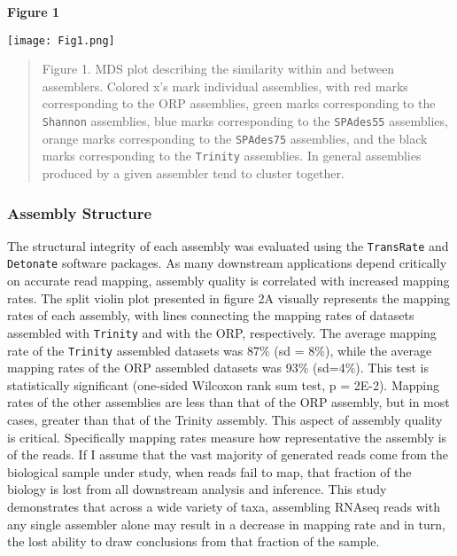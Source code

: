 \documentclass[10pt,letterpaper]{article}
\begin{document}
\newpage
\textbf{\hypertarget{Figure 1}{Figure 1}} \\
\centerline{\texttt{[image: Fig1.png]}}
\begin{quote}
\small{Figure 1. MDS plot describing the similarity within and between assemblers. Colored x's mark individual assemblies, with red marks corresponding to the ORP assemblies, green marks corresponding to the \texttt{Shannon} assemblies, blue marks corresponding to the \texttt{SPAdes55} assemblies, orange marks corresponding to the \texttt{SPAdes75} assemblies, and the black marks corresponding to the \texttt{Trinity} assemblies. In general assemblies produced by a given assembler tend to cluster together.}
\end{quote} 

  

\subsubsection{Assembly Structure}

The structural integrity of each assembly was evaluated using the \texttt{TransRate} and \texttt{Detonate} software packages. As many downstream applications depend critically on accurate read mapping, assembly quality is correlated with increased mapping rates. The split violin plot presented in figure 2A visually represents the mapping rates of each assembly, with lines connecting the mapping rates of datasets assembled with \texttt{Trinity} and with the ORP, respectively. The average mapping rate of the \texttt{Trinity} assembled datasets was 87\% (sd = 8\%), while the average mapping rates of the ORP assembled datasets was 93\% (sd=4\%). This test is statistically significant (one-sided Wilcoxon rank sum test, p = 2E-2). Mapping rates of the other assemblies are less than that of the ORP assembly, but in most cases, greater than that of the Trinity assembly. This aspect of assembly quality is critical. Specifically mapping rates measure how representative the assembly is of the reads. If I assume that the vast majority of generated reads come from the biological sample under study, when reads fail to map, that fraction of the biology is lost from all downstream analysis and inference. This study demonstrates that across a wide variety of taxa, assembling RNAseq reads with any single assembler alone may result in a decrease in mapping rate and in turn, the lost ability to draw conclusions from that fraction of the sample. 
\end{document}
